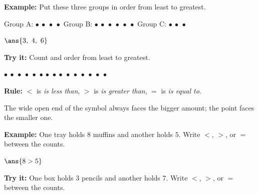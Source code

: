 \documentclass[12pt]{article}
\begin{document}
\begin{examplebox}
\textbf{Example:} \quad Put these three groups in order from least to greatest.\par
Group A: $\bullet\ \bullet\ \bullet\ \bullet$ \qquad Group B: $\bullet\ \bullet\ \bullet\ \bullet\ \bullet\ \bullet$ \qquad Group C: $\bullet\ \bullet\ \bullet$

$\ans{3,\ 4,\ 6}$
\end{examplebox}

\begin{tryitbox}
\textbf{Try it:} \quad Count and order from least to greatest.\par
$\bullet\ \bullet\ \bullet\ \bullet\ \bullet$ \qquad $\bullet\ \bullet$ \qquad $\bullet\ \bullet\ \bullet\ \bullet\ \bullet\ \bullet\ \bullet\ \bullet$\\[2pt]
\end{tryitbox}


\begin{formulabox}
\textbf{Rule:} $<$ is \emph{is less than}, $>$ is \emph{is greater than}, $=$ is \emph{is equal to}.\par
The wide open end of the symbol always faces the bigger amount; the point faces the smaller one.
\end{formulabox}

\begin{examplebox}
\textbf{Example:} \quad One tray holds $8$ muffins and another holds $5$. Write $<$, $>$, or $=$ between the counts.

$\ans{8 > 5}$
\end{examplebox}

\begin{tryitbox}
\textbf{Try it:} \quad One box holds $3$ pencils and another holds $7$. Write $<$, $>$, or $=$ between the counts.\\[2pt]
\end{tryitbox}
\end{document}
